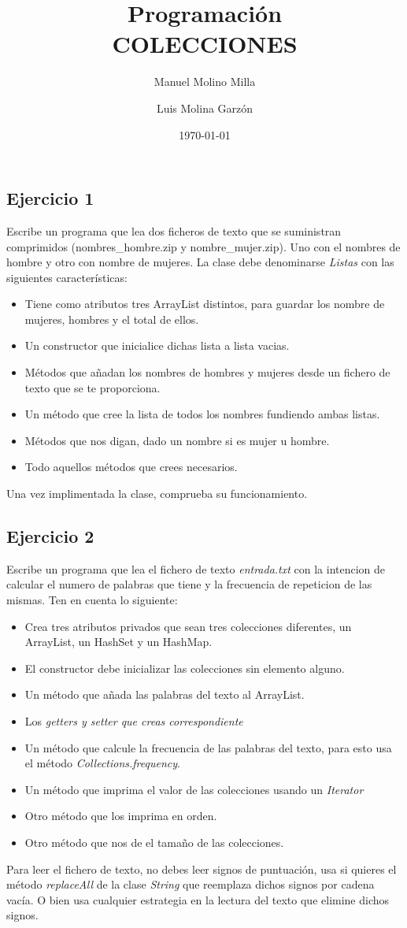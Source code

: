 \documentclass[4paper]{article}
\author{Manuel Molino Milla \and Luis Molina Garzón}
\title{\textbf{Programación}
\\COLECCIONES}
\date{\today}
\begin{document}
\maketitle

\subsection*{Ejercicio 1}
Escribe un programa que lea dos ficheros de texto que se suministran comprimidos (nombres\_hombre.zip y nombre\_mujer.zip). Uno con el nombres de hombre y otro con nombre de mujeres. La clase debe denominarse \emph{Listas} con las siguientes características:
\begin{itemize}
\item Tiene como atributos tres ArrayList distintos, para guardar los nombre de mujeres, hombres y el total de ellos.
\item Un constructor que inicialice dichas lista a lista vacias.
\item Métodos que añadan los nombres de hombres y mujeres desde un fichero de texto que se te proporciona.
\item Un método que cree la lista de todos los nombres fundiendo ambas listas.
\item Métodos que nos digan, dado un nombre si es mujer u hombre.
\item Todo aquellos métodos que crees necesarios.
\end{itemize}
Una vez implimentada la clase, comprueba su funcionamiento.
\subsection*{Ejercicio 2}
Escribe un programa que lea el fichero de texto \emph{entrada.txt} con la intencion de calcular el numero de palabras que tiene y la frecuencia de repeticion de las mismas. Ten en cuenta lo siguiente:
\begin{itemize}
\item Crea tres atributos privados que sean tres colecciones diferentes, un ArrayList, un HashSet y un HashMap.
\item El constructor debe inicializar las colecciones sin elemento alguno.
\item Un método 	que añada las palabras del texto al ArrayList.
\item Los \emph{getters y setter que creas correspondiente}
\item Un método que calcule la frecuencia de las palabras del texto, para esto usa el método \emph{Collections.frequency}.
\item Un método que imprima el valor de las colecciones usando un \emph{Iterator}
\item Otro método que los imprima en orden.
\item Otro método que nos de el tamaño de las colecciones.
\end{itemize}
Para leer el fichero de texto, no debes leer signos de puntuación, usa si quieres el método \emph{replaceAll} de la clase \emph{String} que reemplaza dichos signos por cadena vacía. O bien usa cualquier estrategia en la lectura del texto que elimine dichos signos.
\end{document}
